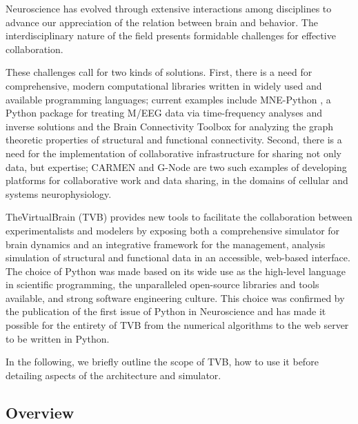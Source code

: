 \documentclass{bioinfo}
\begin{document}
Neuroscience has evolved through extensive interactions among disciplines
to advance our appreciation of the relation between brain and behavior.
The interdisciplinary nature of the field presents formidable challenges
for effective collaboration.

These challenges call for two kinds of solutions. First, there is a need for
comprehensive, modern computational libraries written in widely used and
available programming languages; current examples include MNE-Python
\citep{mnepython}, a Python package for treating M/EEG data via time-frequency
analyses and inverse solutions and the Brain Connectivity Toolbox
\citep{rubinov2010complex} for analyzing the graph theoretic properties of
structural and functional connectivity. Second, there is a need for the
implementation of collaborative infrastructure for sharing not only data, but
expertise; CARMEN \citep{austin2011carmen} and G-Node \citep{herz2008g} are two
such examples of developing platforms for collaborative work and data sharing,
in the domains of cellular and systems neurophysiology.

TheVirtualBrain (TVB) provides new tools to facilitate the collaboration
between experimentalists and modelers by exposing both a comprehensive
simulator for brain dynamics and an integrative framework for the management,
analysis simulation of structural and functional data in an accessible,
web-based interface. The choice of Python was made based on its wide use as the
high-level language in scientific programming, the unparalleled open-source
libraries and tools available, and strong software engineering culture.  This
choice was confirmed by the publication of the first issue of Python in
Neuroscience and has made it possible for the entirety of TVB from the
numerical algorithms to the web server to be written in Python.

In the following, we briefly outline the scope of TVB, how to use it before detailing
aspects of the architecture and simulator.

\subsection{Overview}
\end{document}
